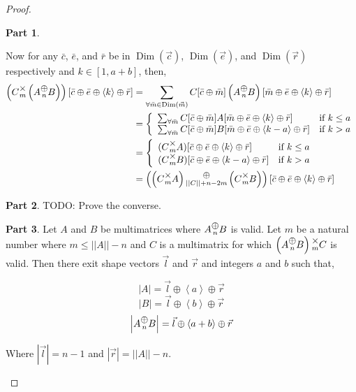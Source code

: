 \documentclass[12pt]{book}
\theoremstyle{plain}
\theoremstyle{definition}
\theoremstyle{ppart}
\newtheorem{ppart}{Part}
\theoremstyle{case}
\theoremstyle{solution}
\DeclareMathOperator{\Dim}{Dim}
\newcommand{\mmult}[1]{\text{\raisebox{1ex}{$\underset{#1}{\times}$}}}
\newcommand{\mconcat}[1]{\text{\raisebox{1ex}{$\underset{#1}{\oplus}$}}}
\newcommand{\shape}[1]{\left|#1\right|}
\begin{document}
\begin{proof}
\begin{ppart}
\begin{landscape}
Now for any $\bar{c}$, $\bar{e}$, and $\bar{r}$ be in $\Dim(\vec{c})$, $\Dim(\vec{e})$,
and $\Dim(\vec{r})$ respectively and $k \in [1,a+b]$, then,
\begin{align*}
  \left(C \mmult{m} \left(A \mconcat{n} B\right)\right)[\bar{c} \oplus \bar{e} \oplus \left<k\right> \oplus \bar{r}]
  &= \sum_{\forall \bar{m} \in \Dim(\vec{m})} C[\bar{c} \oplus \bar{m}] \left(A \mconcat{n} B\right)[\bar{m} \oplus \bar{e} \oplus \left<k\right> \oplus \bar{r}] \\
  &= \left\{
  \begin{array}{ll}
    \sum_{\forall \bar{m}} C[\bar{c} \oplus \bar{m}] A[\bar{m} \oplus \bar{e} \oplus \left<k\right> \oplus \bar{r}]
    & \mbox{if } k \le a \\
    \sum_{\forall \bar{m}} C[\bar{c} \oplus \bar{m}] B[\bar{m} \oplus \bar{e} \oplus \left<k-a\right> \oplus \bar{r}]
    & \mbox{if } k > a
  \end{array}
  \right. \\
  &= \left\{
  \begin{array}{ll}
    (C \mmult{m} A)[\bar{c} \oplus \bar{e} \oplus \left<k\right> \oplus \bar{r}]
    & \mbox{if } k \le a \\
    (C \mmult{m} B)[\bar{c} \oplus \bar{e} \oplus \left<k-a\right> \oplus \bar{r}]
    & \mbox{if } k > a
  \end{array}
  \right. \\
  &= \left(\left(C \mmult{m} A\right) \mconcat{\shape{\shape{C}}+n-2m} \left(C \mmult{m} B\right)\right)[\bar{c} \oplus \bar{e} \oplus \left<k\right> \oplus \bar{r}]
\end{align*}
\end{landscape}
\end{ppart}
\begin{ppart}
TODO: Prove the converse.
\end{ppart}
\begin{ppart}
Let $A$ and $B$ be multimatrices where $A \mconcat{n} B$ is valid. 
Let $m$ be a natural number where $m \le \shape{\shape{A}}-n$
and $C$ is a multimatrix for which $\left(A \mconcat{n} B\right) \mmult{m} C$ is valid.
Then there exit shape vectors $\vec{l}$ and $\vec{r}$ and integers $a$ and $b$ such that,

\[ \shape{A} = \vec{l} \oplus \left<a\right> \oplus \vec{r} \]
\[ \shape{B} = \vec{l} \oplus \left<b\right> \oplus \vec{r} \]
\[ \shape{A \mconcat{n} B} = \vec{l} \oplus \left<a+b\right> \oplus \vec{r} \]

Where $\shape{\vec{l}} = n-1$ and $\shape{\vec{r}} = \shape{\shape{A}}-n$.


\end{ppart}
\end{proof}
\end{document}
